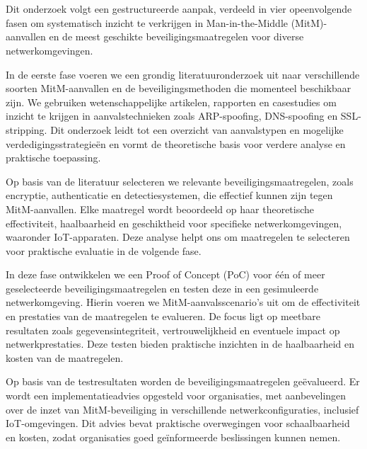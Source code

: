 
\chapter{}%
\label{ch:methodologie}
Dit onderzoek volgt een gestructureerde aanpak, verdeeld in vier opeenvolgende fasen om systematisch inzicht te verkrijgen in Man-in-the-Middle (MitM)-aanvallen en de meest geschikte beveiligingsmaatregelen voor diverse netwerkomgevingen.

In de eerste fase voeren we een grondig literatuuronderzoek uit naar verschillende soorten MitM-aanvallen en de beveiligingsmethoden die momenteel beschikbaar zijn. We gebruiken wetenschappelijke artikelen, rapporten en casestudies om inzicht te krijgen in aanvalstechnieken zoals ARP-spoofing, DNS-spoofing en SSL-stripping. Dit onderzoek leidt tot een overzicht van aanvalstypen en mogelijke verdedigingsstrategieën en vormt de theoretische basis voor verdere analyse en praktische toepassing.


Op basis van de literatuur selecteren we relevante beveiligingsmaatregelen, zoals encryptie, authenticatie en detectiesystemen, die effectief kunnen zijn tegen MitM-aanvallen. Elke maatregel wordt beoordeeld op haar theoretische effectiviteit, haalbaarheid en geschiktheid voor specifieke netwerkomgevingen, waaronder IoT-apparaten. Deze analyse helpt ons om maatregelen te selecteren voor praktische evaluatie in de volgende fase.

In deze fase ontwikkelen we een Proof of Concept (PoC) voor één of meer geselecteerde beveiligingsmaatregelen en testen deze in een gesimuleerde netwerkomgeving. Hierin voeren we MitM-aanvalsscenario's uit om de effectiviteit en prestaties van de maatregelen te evalueren. De focus ligt op meetbare resultaten zoals gegevensintegriteit, vertrouwelijkheid en eventuele impact op netwerkprestaties. Deze testen bieden praktische inzichten in de haalbaarheid en kosten van de maatregelen.


Op basis van de testresultaten worden de beveiligingsmaatregelen geëvalueerd. Er wordt een implementatieadvies opgesteld voor organisaties, met aanbevelingen over de inzet van MitM-beveiliging in verschillende netwerkconfiguraties, inclusief IoT-omgevingen. Dit advies bevat praktische overwegingen voor schaalbaarheid en kosten, zodat organisaties goed geïnformeerde beslissingen kunnen nemen.

